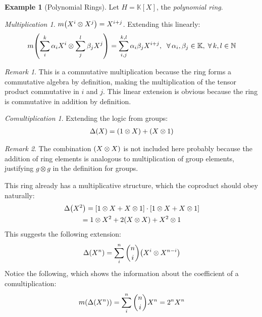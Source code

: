 \documentclass{article}
\theoremstyle{definition}
\newtheorem{Example}{Example}
\theoremstyle{remark}
\newtheorem*{Remark*}{Remark}
\theoremstyle{underline}
\newtheorem*{Multiplication*}{Multiplication}
\theoremstyle{underline}
\newtheorem*{Comultiplication*}{Comultiplication}
\begin{document}
\begin{Example}[Polynomial Rings]
Let $H = \mathbb{K}[X]$, the \emph{polynomial ring}.

\begin{Multiplication*}
$m\pqty{X^i \otimes X^j} = X^{i+j}$. Extending this linearly:
\begin{gather}
	m\pqty{\sum_i^k \alpha_i X^i \otimes \sum_j^l \beta_j X^j} = \sum_{i,j}^{k,l} \alpha_i \beta_j X^{i+j},\;\; \forall\,\alpha_i,\beta_j \in \mathbb K,\; \forall\,	k,l \in \mathbb N
\end{gather}
\end{Multiplication*}

\begin{Remark*}
This is a commutative multiplication because the ring forms a commutative algebra by definition, making the multiplication of the tensor product commutative in $i$ and $j$. This linear extension is obvious because the ring is commutative in addition by definition.
\end{Remark*}

\begin{Comultiplication*}
Extending the logic from groups:
\begin{gather}
	\Delta\pqty{X} = \pqty{1 \otimes X} + \pqty{X \otimes 1}
\end{gather}
\end{Comultiplication*}

\begin{Remark*}
The combination $\pqty{X \otimes X}$ is not included here probably because the addition of ring elements is analogous to multiplication of group elements, justifying $g \otimes g$ in the definition for groups. \\
\end{Remark*}

This ring already has a multiplicative structure, which the coproduct should obey naturally:
\begin{gather}
	\Delta\pqty{X^2} = \bqty{1 \otimes X + X \otimes 1} \cdot \bqty{1 \otimes X + X \otimes 1} \\
	= 1 \otimes X^2 + 2\pqty{X\otimes X} + X^2 \otimes 1 
\end{gather}
This suggests the following extension:
\begin{gather}
	\Delta\pqty{X^{n}} = \sum_{i}^{n} \binom{n}{i}\pqty{X^{i} \otimes X^{n-i}} 
\end{gather}
Notice the following, which shows the information about the coefficient of a comultiplication:
\begin{gather}
	m\pqty{\Delta\pqty{X^n}} = \sum_{i}^{n} \binom{n}{i}X^n =  2^nX^n
\end{gather}

\end{Example}
\end{document}

